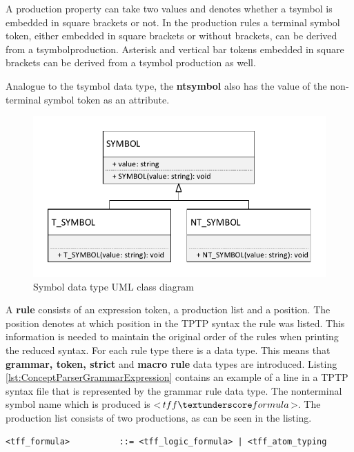 A production property can take two values and denotes whether a t\textunderscore  symbol is embedded in square brackets or not. In the production rules a terminal symbol token, either embedded in square brackets or without brackets, can be derived from a t\textunderscore  symbol\textunderscore  production. Asterisk and vertical bar tokens embedded in square brackets can be derived from a t\textunderscore  symbol production as well. 

Analogue to the t\textunderscore symbol data type, the \textbf{nt\textunderscore  symbol} also has the value of the non-terminal symbol token as an attribute. 

\begin{figure}[H]
\centering
\includegraphics[width=.8\textwidth]{images/Concept_uml_data_types_symbols.pdf}
\caption{Symbol data type UML class diagram}
\label{fig:ConceptSymbolsClassDiagram}
\end{figure}

A \textbf{rule} consists of an expression token, a production list and a position.
The position denotes at which position in the TPTP syntax the rule was listed.
This information is needed to maintain the original order of the rules when printing the reduced syntax.
For each rule type there is a data type.
This means that \textbf{grammar, token, strict} and \textbf{macro rule} data types are introduced.
Listing \ref{lst:ConceptParserGrammarExpression} contains an example of a line in a \ac{TPTP} syntax file that is represented by the grammar rule data type.
The nonterminal symbol name which is produced is <$tff \textunderscore formula$>.  The production list consists of two productions, as can be seen in the listing.
\begin{lstlisting}[basicstyle=\scriptsize	,caption= Grammar expression,label= lst:ConceptParserGrammarExpression]
<tff_formula>          ::= <tff_logic_formula> | <tff_atom_typing
\end{lstlisting}


